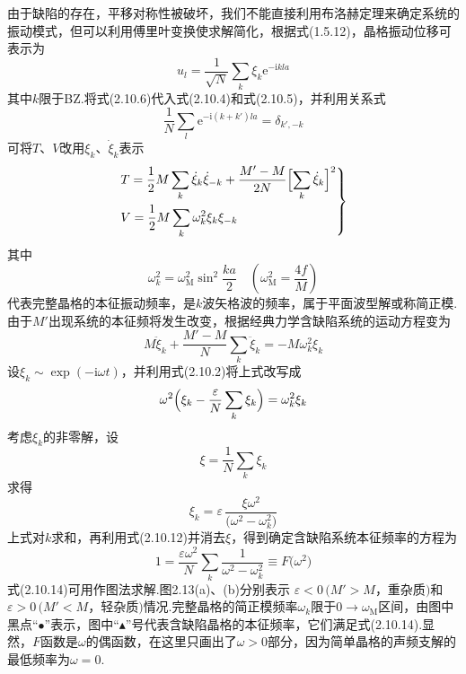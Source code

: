 由于缺陷的存在，平移对称性被破坏，我们不能直接利用布洛赫定理来确定系统的振动模式，但可以利用傅里叶变换使求解简化，根据式(1.5.12)，晶格振动位移可表示为
\begin{equation}
  u_l=\frac{1}{\sqrt{N}}\sum_k\xi_k\mathrm{e}^{-\mathrm{i}kla}
\end{equation}
其中$k$限于BZ.将式(2.10.6)代入式(2.10.4)和式(2.10.5)，并利用关系式
\begin{equation}
  \frac{1}{N}\sum_l\mathrm{e}^{-\mathrm{i}(k+k')la}=\delta_{k',-k}
\end{equation}
可将$T$、$V$改用$\xi_k$、$\dot{\xi}_k$表示
\begin{equation}
\left.\begin{aligned}
  &T=\frac{1}{2}M\sum_k\dot{\xi}_k\dot{\xi}_{-k}
  +\frac{M'-M}{2N}\Bigl[\sum_k\dot{\xi}_k\Bigr]^2\\
  &V=\frac{1}{2}M\sum_k\omega_k^2\xi_k\xi_{-k}
\end{aligned}\right\}
\end{equation}
其中
\begin{equation}
  \omega_k^2=\omega_{\mathrm{M}}^2\sin^2\frac{ka}{2}
  \quad\left(\omega_{\mathrm{M}}^2=\frac{4f}{M}\right)
\end{equation}
代表完整晶格的本征振动频率，是$k$波矢格波的频率，属于平面波型解或称简正模.由于$M'$出现系统的本征频将发生改变，根据经典力学含缺陷系统的运动方程变为
\begin{equation}
  M\ddot{\xi}_k+\frac{M'-M}{N}\sum_k\ddot{\xi}_k
  =-M\omega_k^2\xi_k
\end{equation}
设$\xi_k\sim\exp(-\mathrm{i}\omega t)$，并利用式(2.10.2)将上式改写成
\begin{equation}
  \omega^2\Bigl(\xi_k-\frac{\varepsilon}{N}\sum_k\xi_k\Bigr)
  =\omega_k^2\xi_k
\end{equation}
考虑$\xi_k$的非零解，设
\begin{equation}
  \xi=\frac{1}{N}\sum_k\xi_k
\end{equation}
求得
\begin{equation}
  \xi_k=\varepsilon\,\frac{\xi\omega^2}{\bigl(\omega^2-\omega_k^2\bigr)}
\end{equation}
上式对$k$求和，再利用式(2.10.12)并消去$\xi$，得到确定含缺陷系统本征频率的方程为
\begin{equation}
  1=\frac{\varepsilon\omega^2}{N}\sum_k
  \frac{1}{\omega^2-\omega_k^2}\equiv F\bigl(\omega^2\bigr)
\end{equation}
式(2.10.14)可用作图法求解.图2.13(a)、(b)分别表示
$\varepsilon<0\,(M'>M$，重杂质$)$和$\varepsilon>0\,(M'<M$，轻杂质$)$情况.完整晶格的简正模频率$\omega_k$限于$0\to\omega_{\mathrm{M}}$区间，由图中黑点“$\bullet$”表示，图中“$\blacktriangle$”号代表含缺陷晶格的本征频率，它们满足式(2.10.14).显然，$F$函数是$\omega$的偶函数，在这里只画出了$\omega>0$部分，因为简单晶格的声频支解的最低频率为$\omega=0$.

